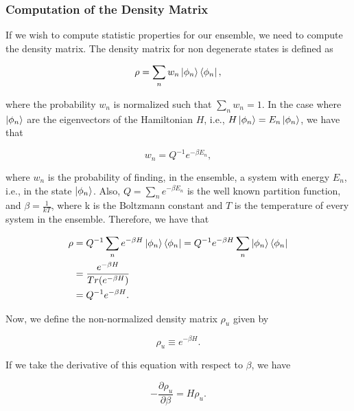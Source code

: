 \documentclass{article}
\begin{document}
\subsubsection{Computation of the Density Matrix}
If we wish to compute statistic properties for our ensemble, we need to compute the density matrix. The density matrix for non degenerate states is defined as

\begin{equation}
    \rho = \sum_{n} w_{n} \ket{\phi_n} \bra{\phi_n},
\end{equation}

where the probability $w_{n}$ is normalized such that $\sum_{n} w_{n} = 1$. In the case where $\ket{\phi_n}$ are the eigenvectors of the Hamiltonian $H$, i.e., $H \ket{\phi_n} = E_n \ket{\phi_n}$, we have that

\begin{equation}
    w_{n} = Q^{-1} e^{-\beta E_{n}},
\end{equation}

where $w_{n}$ is the probability of finding, in the ensemble, a system with energy $E_{n}$, i.e., in the state $\ket{\phi_n}$.
Also, $Q = \sum_{n} e^{-\beta E_{n}}$ is the well known partition function, and $\beta = \frac{1}{k T}$, where k is the Boltzmann constant and $T$ is the temperature of every system in the ensemble. Therefore, we have that

\begin{equation}
    \begin{split}
        \rho & = Q^{-1} \sum_{n} e^{-\beta H} \ket{\phi_n} \bra{\phi_n} = Q^{-1} e^{-\beta H} \sum_{n} \ket{\phi_n} \bra{\phi_n} \\ & = \frac{e^{-\beta H}}{Tr(e^{-\beta H})} \\ & = Q^{-1} e^{-\beta H}.
    \end{split}
\end{equation}

Now, we define the non-normalized density matrix $\rho_u$ given by

\begin{equation}
    \rho_u \equiv e^{-\beta H}.
\end{equation}

If we take the derivative of this equation with respect to $\beta$, we have

\begin{equation}\label{bloch_eq}
    - \frac{\partial \rho_u}{\partial \beta} = H \rho_u.
\end{equation}
\end{document}
